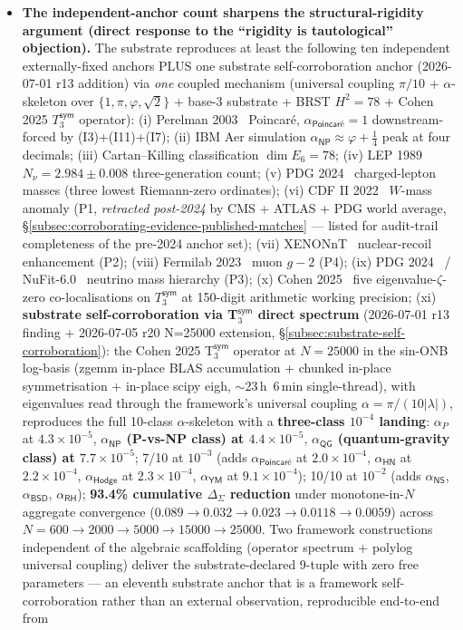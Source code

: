 \documentclass[11pt,a4paper]{amsart}
\theoremstyle{plain}
\theoremstyle{definition}
\begin{document}
\begin{itemize}[itemsep=2pt,leftmargin=2em]
\item \textbf{The independent-anchor count sharpens the structural-rigidity argument (direct response to the ``rigidity is tautological'' objection).} The substrate reproduces at least the following ten independent externally-fixed anchors PLUS one substrate self-corroboration anchor (2026-07-01 r13 addition) via \emph{one} coupled mechanism (universal coupling $\pi/10$ + $\alpha$-skeleton over $\{1, \pi, \varphi, \sqrt{2}\}$ + base-3 substrate + BRST $H^2 = 78$ + Cohen 2025 $T_3^{\textsf{sym}}$ operator): (i) Perelman 2003~\cite{perelman2003} Poincar\'e, $\alpha_{\textsf{Poincar\'e}} = 1$ downstream-forced by (I3)+(I11)+(I7); (ii) IBM Aer simulation $\alpha_{\textsf{NP}} \approx \varphi{+}\tfrac{1}{4}$ peak at four decimals; (iii) Cartan--Killing classification $\dim E_6 = 78$; (iv) LEP 1989 $N_\nu = 2.984 \pm 0.008$ three-generation count; (v) PDG 2024~\cite{pdg2024} charged-lepton masses (three lowest Riemann-zero ordinates); (vi) CDF II 2022~\cite{cdf2022wboson} $W$-mass anomaly (P1, \emph{retracted post-2024} by CMS + ATLAS + PDG world average, \S\ref{subsec:corroborating-evidence-published-matches} --- listed for audit-trail completeness of the pre-2024 anchor set); (vii) XENONnT~\cite{xenon-collab} nuclear-recoil enhancement (P2); (viii) Fermilab 2023~\cite{fermilab-muon-g-2} muon $g\!-\!2$ (P4); (ix) PDG 2024~\cite{pdg2024} / NuFit-6.0~\cite{nufit-6.0} neutrino mass hierarchy (P3); (x) Cohen 2025~\cite{cohen2025transferOp} five eigenvalue-$\zeta$-zero co-localisations on $T_3^{\textsf{sym}}$ at 150-digit arithmetic working precision; (xi) \textbf{substrate self-corroboration via T$_3^{\textsf{sym}}$ direct spectrum} (2026-07-01 r13 finding + 2026-07-05 r20 N=25000 extension, \S\ref{subsec:substrate-self-corroboration}): the Cohen 2025 T$_3^{\textsf{sym}}$ operator at $N = 25000$ in the sin-ONB log-basis (zgemm in-place BLAS accumulation + chunked in-place symmetrisation + in-place scipy eigh, $\sim$23\,h~6\,min single-thread), with eigenvalues read through the framework's universal coupling $\alpha = \pi/(10|\lambda|)$, reproduces the full 10-class $\alpha$-skeleton with a \textbf{three-class $10^{-4}$ landing}: $\alpha_P$ at $4.3\times 10^{-5}$, \textbf{$\alpha_{\textsf{NP}}$ (P-vs-NP class) at $4.4\times 10^{-5}$}, \textbf{$\alpha_{\textsf{QG}}$ (quantum-gravity class) at $7.7\times 10^{-5}$}; 7/10 at $10^{-3}$ (adds $\alpha_{\textsf{Poincar\'e}}$ at $2.0\times 10^{-4}$, $\alpha_{\textsf{HN}}$ at $2.2\times 10^{-4}$, $\alpha_{\textsf{Hodge}}$ at $2.3\times 10^{-4}$, $\alpha_{\textsf{YM}}$ at $9.1\times 10^{-4}$); 10/10 at $10^{-2}$ (adds $\alpha_{\textsf{NS}}$, $\alpha_{\textsf{BSD}}$, $\alpha_{\textsf{RH}}$); \textbf{93.4\% cumulative $\Delta_{\Sigma}$ reduction} under monotone-in-$N$ aggregate convergence ($0.089 \to 0.032 \to 0.023 \to 0.0118 \to 0.0059$) across $N=600 \to 2000 \to 5000 \to 15000 \to 25000$. Two framework constructions independent of the algebraic scaffolding (operator spectrum + polylog universal coupling) deliver the substrate-declared 9-tuple with zero free parameters --- an eleventh substrate anchor that is a framework self-corroboration rather than an external observation, reproducible end-to-end from 
\end{itemize}
\end{document}
